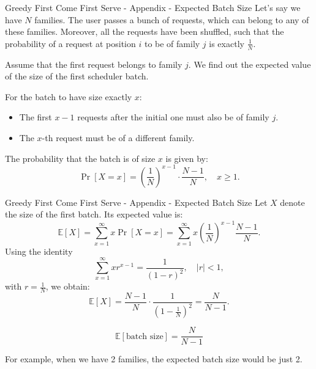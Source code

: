 \documentclass[Serif, 10pt, brown]{beamer}
\theoremstyle{example}
\theoremstyle{plain}
\begin{document}
\begin{frame}{Greedy First Come First Serve - Appendix - Expected Batch Size}
    Let's say we have $N$ families. The user passes a bunch of requests, which can belong to any of these families. Moreover, all the requests have been shuffled, such that the probability of a request at position $i$ to be of family $j$ is exactly $\frac{1}{N}$.

    Assume that the first request belongs to family $j$. We find out the expected value of the size of the first scheduler batch.

    For the batch to have size exactly $x$:
    \begin{itemize}
        \item The first $x - 1$ requests after the initial one must also be of family $j$.
        \item The $x$-th request must be of a different family.
    \end{itemize}


    The probability that the batch is of size $x$ is given by:
    \[
        \Pr[X = x]
        = \left(\frac{1}{N}\right)^{x-1} \cdot \frac{N-1}{N}, \quad x \ge 1.
    \]
\end{frame}



\begin{frame}{Greedy First Come First Serve - Appendix - Expected Batch Size}
    Let $X$ denote the size of the first batch. Its expected value is:
    \[
        \mathbb{E}[X]
        = \sum_{x=1}^{\infty} x \Pr[X = x]
        = \sum_{x=1}^{\infty} x \left(\frac{1}{N}\right)^{x-1} \frac{N-1}{N}.
    \]
    Using the identity
    \[
        \sum_{x=1}^{\infty} x r^{x-1} = \frac{1}{(1-r)^2}, \quad |r| < 1,
    \]
    with $r = \frac{1}{N}$, we obtain:
    \[
        \mathbb{E}[X]
        = \frac{N-1}{N} \cdot \frac{1}{\left(1 - \frac{1}{N}\right)^2}
        = \frac{N}{N-1}.
    \]

    \vspace{0.3cm}
    \[
        \boxed{\mathbb{E}[\text{batch size}] = \frac{N}{N-1}}
    \]

    For example, when we have 2 families, the expected batch size would be just 2.
\end{frame}
\end{document}
